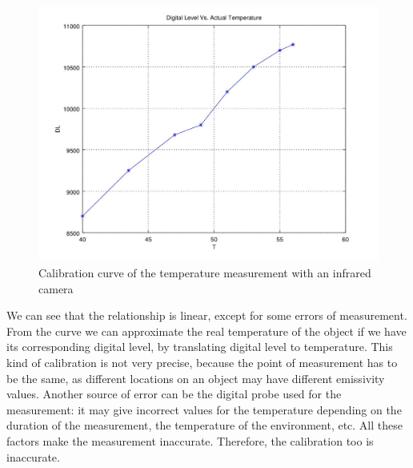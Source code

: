\documentclass[english]{article}
\begin{document}
\begin{figure}[H]
	\centering
	\includegraphics[width=1\linewidth]{Pictures/calibplot.jpg}
	\caption{Calibration curve of the temperature measurement with an infrared camera}
	\label{fig:five}
\end{figure}

We can see that the relationship is linear, except for some errors of measurement.
From the curve we can approximate the real temperature of the object if we have its corresponding digital level, by translating digital level to temperature.
This kind of calibration is not very precise, because the point of measurement has to be the same, as different locations on an object may have different emissivity values.
Another source of error can be the digital probe used for the measurement: it may give incorrect values for the temperature depending on the duration of the measurement, the temperature of the environment, etc.
All these factors make the measurement inaccurate.
Therefore, the calibration too is inaccurate.
\end{document}
